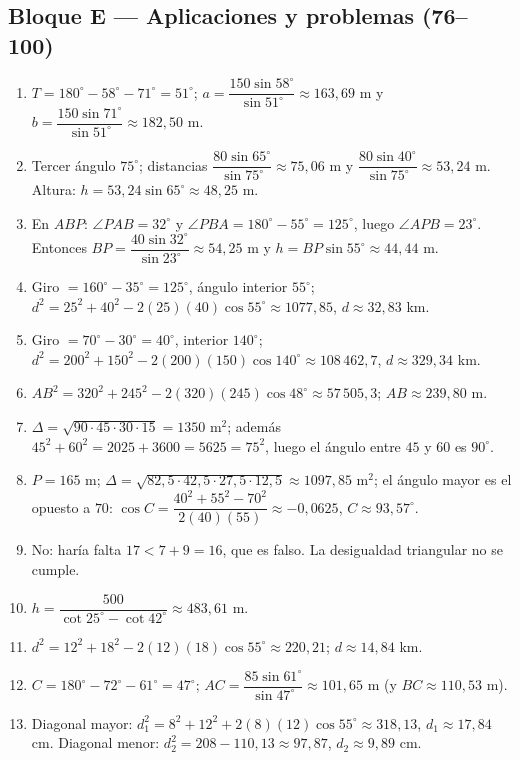 \documentclass[12pt, letterpaper]{article}
\providecommand{\sen}{\sin}
\begin{document}
\subsection*{Bloque E — Aplicaciones y problemas (76--100)}
\begin{enumerate}[leftmargin=*, label=\textbf{\arabic*.}, start=76]
  \item $T=180^\circ-58^\circ-71^\circ=51^\circ$; $a=\dfrac{150\sen 58^\circ}{\sen 51^\circ}\approx 163{,}69$ m y $b=\dfrac{150\sen 71^\circ}{\sen 51^\circ}\approx 182{,}50$ m.
  \item Tercer ángulo $75^\circ$; distancias $\dfrac{80\sen 65^\circ}{\sen 75^\circ}\approx 75{,}06$ m y $\dfrac{80\sen 40^\circ}{\sen 75^\circ}\approx 53{,}24$ m. Altura: $h=53{,}24\sen 65^\circ\approx 48{,}25$ m.
  \item En $ABP$: $\angle PAB=32^\circ$ y $\angle PBA=180^\circ-55^\circ=125^\circ$, luego $\angle APB=23^\circ$. Entonces $BP=\dfrac{40\sen 32^\circ}{\sen 23^\circ}\approx 54{,}25$ m y $h=BP\sen 55^\circ\approx 44{,}44$ m.
  \item Giro $=160^\circ-35^\circ=125^\circ$, ángulo interior $55^\circ$; $d^2=25^2+40^2-2(25)(40)\cos 55^\circ\approx 1077{,}85$, $d\approx 32{,}83$ km.
  \item Giro $=70^\circ-30^\circ=40^\circ$, interior $140^\circ$; $d^2=200^2+150^2-2(200)(150)\cos 140^\circ\approx 108\,462{,}7$, $d\approx 329{,}34$ km.
  \item $AB^2=320^2+245^2-2(320)(245)\cos 48^\circ\approx 57\,505{,}3$; $AB\approx 239{,}80$ m.
  \item $\Delta=\sqrt{90\cdot45\cdot30\cdot15}=1350$ m$^2$; además $45^2+60^2=2025+3600=5625=75^2$, luego el ángulo entre $45$ y $60$ es $90^\circ$.
  \item $P=165$ m; $\Delta=\sqrt{82{,}5\cdot42{,}5\cdot27{,}5\cdot12{,}5}\approx 1097{,}85$ m$^2$; el ángulo mayor es el opuesto a $70$: $\cos C=\dfrac{40^2+55^2-70^2}{2(40)(55)}\approx-0{,}0625$, $C\approx 93{,}57^\circ$.
  \item No: haría falta $17<7+9=16$, que es falso. La desigualdad triangular no se cumple.
  \item $h=\dfrac{500}{\cot 25^\circ-\cot 42^\circ}\approx 483{,}61$ m.
  \item $d^2=12^2+18^2-2(12)(18)\cos 55^\circ\approx 220{,}21$; $d\approx 14{,}84$ km.
  \item $C=180^\circ-72^\circ-61^\circ=47^\circ$; $AC=\dfrac{85\sen 61^\circ}{\sen 47^\circ}\approx 101{,}65$ m (y $BC\approx 110{,}53$ m).
  \item Diagonal mayor: $d_1^2=8^2+12^2+2(8)(12)\cos 55^\circ\approx 318{,}13$, $d_1\approx 17{,}84$ cm. Diagonal menor: $d_2^2=208-110{,}13\approx 97{,}87$, $d_2\approx 9{,}89$ cm.

\end{enumerate}
\end{document}

